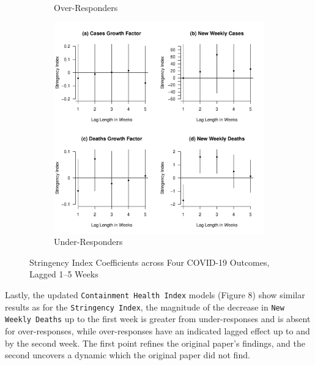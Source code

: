 \documentclass[12pt,letterpaper]{article}
\begin{document}
\begin{figure}[p]
\begin{subfigure}[b]{0.48\textwidth}
			\caption{Over-Responders}
			\label{fig:asi}
		\end{subfigure}
		\begin{subfigure}[b]{0.48\textwidth}
			\centering
			\includegraphics[width=\textwidth]{bsi.pdf}
			\caption{Under-Responders}
			\label{fig:bsi}
		\end{subfigure}
		\caption{Stringency Index Coefficients across Four COVID-19 Outcomes, Lagged 1–5 Weeks}
		\label{fig:all_si}
	\end{figure}
	
	\vspace{.25cm}
	\noindent Lastly, the updated \texttt{Containment Health Index} models (Figure 8) show similar results as for the \texttt{Stringency Index}, the magnitude of the decrease in \texttt{New Weekly Deaths} up to the first week is greater from under-responses and is absent for over-responses, while over-responses have an indicated lagged effect up to and by the second week. The first point refines the original paper's findings, and the second uncovers a dynamic which the original paper did not find.
	
\end{document}
